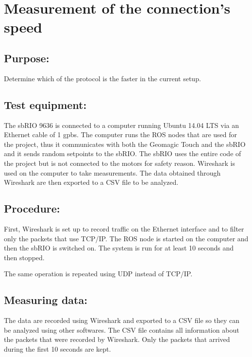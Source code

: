 \section*{Measurement of the connection's speed} %

\subsection*{Purpose:}

Determine which of the protocol is the faster in the current setup.

\subsection*{Test equipment:}

The sbRIO 9636 is connected to a computer running Ubuntu 14.04 LTS via an Ethernet cable of 1 gpbs. The computer runs the ROS nodes that are used for the project, thus it communicates with both the Geomagic Touch and the sbRIO and it sends random setpoints to the sbRIO. The sbRIO uses the entire code of the project but is not connected to the motors for safety reason. 
Wireshark is used on the computer to take measurements. The data obtained through Wireshark are then exported to a CSV file to be analyzed.

\subsection*{Procedure:}

First, Wireshark is set up to record traffic on the Ethernet interface and to filter only the packets that use TCP/IP. The ROS node is started on the computer and then the sbRIO is switched on. The system is run for at least 10 seconds and then stopped.

The same operation is repeated using UDP instead of TCP/IP.

\subsection*{Measuring data:}

The data are recorded using Wireshark and exported to a CSV file so they can be analyzed using other softwares. The CSV file contains all information about the packets that were recorded by Wireshark. Only the packets that arrived during the first 10 seconds are kept.

